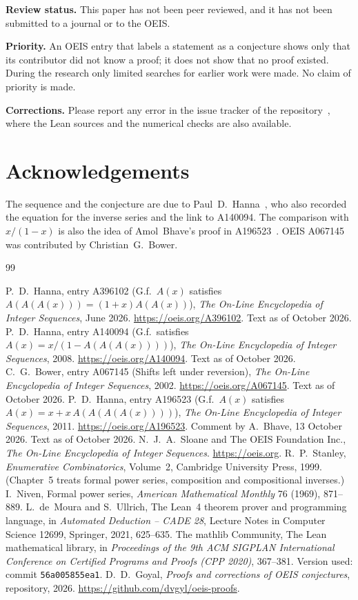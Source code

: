 \documentclass[11pt,a4paper]{article}
\theoremstyle{definition}
\theoremstyle{remark}
\newcommand{\para}[1]{\par\medskip\noindent\textbf{#1}\enspace}
\begin{document}
\para{Review status.} This paper has not been peer reviewed, and it has not been submitted to a journal or to the OEIS.

\para{Priority.} An OEIS entry that labels a statement as a conjecture shows only that its contributor did not know
a proof; it does not show that no proof existed. During the research only limited searches for earlier work were
made. No claim of priority is made.

\para{Corrections.} Please report any error in the issue tracker of the repository~\cite{repo}, where the Lean sources and the numerical checks are also
available.

\section*{Acknowledgements}
The sequence and the conjecture are due to Paul~D.~Hanna~\cite{oeis}, who also recorded the equation for the inverse
series and the link to A140094. The comparison with $x/(1-x)$ is also the idea of Amol~Bhave's proof in
A196523~\cite{oeisB}. OEIS A067145 was contributed by Christian~G.~Bower.

\begin{thebibliography}{99}\small
\raggedright
{} P.~D.~Hanna, entry A396102 (G.f.\ $A(x)$ satisfies $A(A(A(x)))=(1+x)A(A(x))$), \emph{The On-Line Encyclopedia of Integer Sequences}, June 2026. \url{https://oeis.org/A396102}. Text as of October 2026.
 P.~D.~Hanna, entry A140094 (G.f.\ satisfies $A(x)=x/(1-A(A(A(x))))$), \emph{The On-Line Encyclopedia of Integer Sequences}, 2008. \url{https://oeis.org/A140094}. Text as of October 2026.
 C.~G.~Bower, entry A067145 (Shifts left under reversion), \emph{The On-Line Encyclopedia of Integer Sequences}, 2002. \url{https://oeis.org/A067145}. Text as of October 2026.
 P.~D.~Hanna, entry A196523 (G.f.\ $A(x)$ satisfies $A(x)=x+x\,A(A(A(A(x))))$), \emph{The On-Line Encyclopedia of Integer Sequences}, 2011. \url{https://oeis.org/A196523}. Comment by A.~Bhave, 13 October 2026. Text as of October 2026.
 N.~J.~A.~Sloane and The OEIS Foundation Inc., \emph{The On-Line Encyclopedia of Integer Sequences}. \url{https://oeis.org}.
 R.~P.~Stanley, \emph{Enumerative Combinatorics}, Volume~2, Cambridge University Press, 1999. (Chapter~5 treats formal power series, composition and compositional inverses.)
 I.~Niven, Formal power series, \emph{American Mathematical Monthly} 76 (1969), 871--889.
 L.~de~Moura and S.~Ullrich, The Lean~4 theorem prover and programming language, in \emph{Automated Deduction -- CADE 28}, Lecture Notes in Computer Science 12699, Springer, 2021, 625--635.
 The mathlib Community, The Lean mathematical library, in \emph{Proceedings of the 9th ACM SIGPLAN International Conference on Certified Programs and Proofs (CPP 2020)}, 367--381. Version used: commit \texttt{56a005855ea1}.
 D.~D.~Goyal, \emph{Proofs and corrections of OEIS conjectures}, repository, 2026. \url{https://github.com/dvgyl/oeis-proofs}.
\end{thebibliography}
\end{document}
